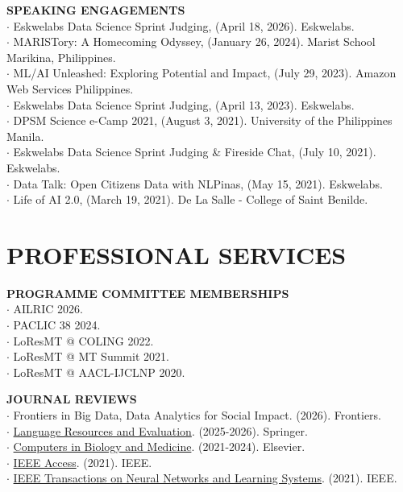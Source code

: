 \documentclass[margin]{res}
\begin{document}
\begin{resume}
\newpage
\textbf{SPEAKING ENGAGEMENTS}\\
$\cdot$ Eskwelabs Data Science Sprint Judging, (April 18, 2026). Eskwelabs.\\
$\cdot$ MARISTory: A Homecoming Odyssey, (January 26, 2024). Marist School Marikina, Philippines.\\
$\cdot$ ML/AI Unleashed: Exploring Potential and Impact, (July 29, 2023). Amazon Web Services Philippines.\\
$\cdot$ Eskwelabs Data Science Sprint Judging, (April 13, 2023). Eskwelabs.\\
$\cdot$ DPSM Science e-Camp 2021, (August 3, 2021). University of the Philippines Manila.\\
$\cdot$ Eskwelabs Data Science Sprint Judging \& Fireside Chat, (July 10, 2021). Eskwelabs.\\
$\cdot$ Data Talk: Open Citizens Data with NLPinas, (May 15, 2021). Eskwelabs.\\
$\cdot$ Life of AI 2.0, (March 19, 2021). De La Salle - College of Saint Benilde.

\section{PROFESSIONAL SERVICES}
\textbf{PROGRAMME COMMITTEE MEMBERSHIPS}\\
$\cdot$ AILRIC 2026.\\
$\cdot$ PACLIC 38 2024.\\
$\cdot$ LoResMT @ COLING 2022.\\
$\cdot$ LoResMT @ MT Summit 2021.\\
$\cdot$ LoResMT @ AACL-IJCLNP 2020.

\textbf{JOURNAL REVIEWS}\\
$\cdot$ Frontiers in Big Data, Data Analytics for Social Impact. (2026). Frontiers.\\
$\cdot$ \href{https://www.springer.com/journal/10579}{Language Resources and Evaluation}. (2025-2026). Springer.\\
$\cdot$ \href{https://www.sciencedirect.com/journal/computers-in-biology-and-medicine}{Computers in Biology and Medicine}. (2021-2024). Elsevier.\\
$\cdot$ \href{https://ieeeaccess.ieee.org/}{IEEE Access}. (2021). IEEE.\\
$\cdot$ \href{https://ieeexplore.ieee.org/xpl/RecentIssue.jsp?punumber=5962385}{IEEE Transactions on Neural Networks and Learning Systems}. (2021). IEEE.


\end{resume}
\end{document}
